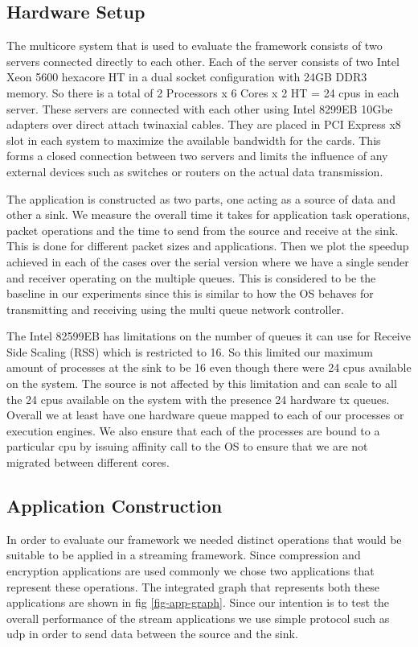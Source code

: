 \documentclass[conference]{IEEEtran}
\begin{document}
\subsection{Hardware Setup}

The multicore system that is used to evaluate the framework consists of two servers connected directly to each other. Each of the server consists of two Intel Xeon 5600 hexacore HT in a dual socket configuration with 24GB DDR3 memory. So there is a total of 2 Processors x 6 Cores x 2 HT = 24 cpus in each server. These servers are connected with each other using Intel 8299EB 10Gbe adapters over direct attach twinaxial cables. They are placed in PCI Express x8 slot in each system to maximize the available bandwidth for the cards. This forms a closed connection between two servers and limits the influence of any external devices such as switches or routers on the actual data transmission. 

The application is constructed as two parts, one acting as a source of data and other a sink. We measure the overall time it takes for application task operations, packet operations and the time to send from the source and receive at the sink. This is done for different packet sizes and applications. Then we plot the speedup achieved in each of the cases over the serial version where we have a single sender and receiver operating on the multiple queues. This is considered to be the baseline in our experiments since this is similar to how the OS behaves for transmitting and receiving using the multi queue network controller.

The Intel 82599EB has limitations on the number of queues it can use for Receive Side Scaling (RSS) which is restricted to 16. So this limited our maximum amount of processes at the sink to be 16 even though there were 24 cpus available on the system. The source is not affected by this limitation and can scale to all the 24 cpus available on the system with the presence 24 hardware tx queues. Overall we at least have one hardware queue mapped to each of our processes or execution engines. We also ensure that each of the processes are bound to a particular cpu by issuing affinity call to the OS to ensure that we are not migrated between different cores.

\subsection{Application Construction}
\label{app-const}

In order to evaluate our framework we needed distinct operations that would be suitable to be applied in a streaming framework. Since compression and encryption applications are used commonly we chose two applications that represent these operations. The integrated graph that represents both these applications are shown in fig \ref{fig-app-graph}. Since our intention is to test the overall performance of the stream applications we use simple protocol such as udp in order to send data between the source and the sink.
\end{document}
